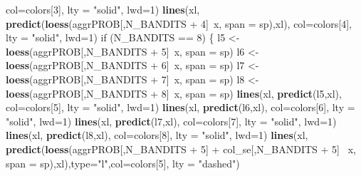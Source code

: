 \documentclass[11pt,,]{article}
\newenvironment{Shaded}{\begin{snugshade}}{\end{snugshade}}
\newcommand{\KeywordTok}[1]{\textcolor[rgb]{0.13,0.29,0.53}{\textbf{{#1}}}}
\newcommand{\DataTypeTok}[1]{\textcolor[rgb]{0.13,0.29,0.53}{{#1}}}
\newcommand{\DecValTok}[1]{\textcolor[rgb]{0.00,0.00,0.81}{{#1}}}
\newcommand{\StringTok}[1]{\textcolor[rgb]{0.31,0.60,0.02}{{#1}}}
\newcommand{\NormalTok}[1]{{#1}}
\begin{document}
\begin{Shaded}
\begin{Highlighting}[]
{          \DataTypeTok{col=}\NormalTok{colors[}\DecValTok{3}\NormalTok{], }\DataTypeTok{lty =} \StringTok{"solid"}\NormalTok{, }\DataTypeTok{lwd=}\DecValTok{1}\NormalTok{)}
    \KeywordTok{lines}\NormalTok{(xl, }\KeywordTok{predict}\NormalTok{(}\KeywordTok{loess}\NormalTok{(aggrPROB[,N_BANDITS +}\StringTok{ }\DecValTok{4}\NormalTok{]~x, }\DataTypeTok{span =} \NormalTok{sp),xl), }
          \DataTypeTok{col=}\NormalTok{colors[}\DecValTok{4}\NormalTok{], }\DataTypeTok{lty =} \StringTok{"solid"}\NormalTok{, }\DataTypeTok{lwd=}\DecValTok{1}\NormalTok{)}
    \NormalTok{if (N_BANDITS ==}\StringTok{ }\DecValTok{8}\NormalTok{) \{}
        \NormalTok{l5 <-}\StringTok{ }\KeywordTok{loess}\NormalTok{(aggrPROB[,N_BANDITS +}\StringTok{ }\DecValTok{5}\NormalTok{]~x, }\DataTypeTok{span =} \NormalTok{sp)}
        \NormalTok{l6 <-}\StringTok{ }\KeywordTok{loess}\NormalTok{(aggrPROB[,N_BANDITS +}\StringTok{ }\DecValTok{6}\NormalTok{]~x, }\DataTypeTok{span =} \NormalTok{sp)}
        \NormalTok{l7 <-}\StringTok{ }\KeywordTok{loess}\NormalTok{(aggrPROB[,N_BANDITS +}\StringTok{ }\DecValTok{7}\NormalTok{]~x, }\DataTypeTok{span =} \NormalTok{sp)}
        \NormalTok{l8 <-}\StringTok{ }\KeywordTok{loess}\NormalTok{(aggrPROB[,N_BANDITS +}\StringTok{ }\DecValTok{8}\NormalTok{]~x, }\DataTypeTok{span =} \NormalTok{sp)}
        \KeywordTok{lines}\NormalTok{(xl, }\KeywordTok{predict}\NormalTok{(l5,xl), }\DataTypeTok{col=}\NormalTok{colors[}\DecValTok{5}\NormalTok{], }\DataTypeTok{lty =} \StringTok{"solid"}\NormalTok{, }\DataTypeTok{lwd=}\DecValTok{1}\NormalTok{)}
        \KeywordTok{lines}\NormalTok{(xl, }\KeywordTok{predict}\NormalTok{(l6,xl), }\DataTypeTok{col=}\NormalTok{colors[}\DecValTok{6}\NormalTok{], }\DataTypeTok{lty =} \StringTok{"solid"}\NormalTok{, }\DataTypeTok{lwd=}\DecValTok{1}\NormalTok{)}
        \KeywordTok{lines}\NormalTok{(xl, }\KeywordTok{predict}\NormalTok{(l7,xl), }\DataTypeTok{col=}\NormalTok{colors[}\DecValTok{7}\NormalTok{], }\DataTypeTok{lty =} \StringTok{"solid"}\NormalTok{, }\DataTypeTok{lwd=}\DecValTok{1}\NormalTok{)}
        \KeywordTok{lines}\NormalTok{(xl, }\KeywordTok{predict}\NormalTok{(l8,xl), }\DataTypeTok{col=}\NormalTok{colors[}\DecValTok{8}\NormalTok{], }\DataTypeTok{lty =} \StringTok{"solid"}\NormalTok{, }\DataTypeTok{lwd=}\DecValTok{1}\NormalTok{)}
        \KeywordTok{lines}\NormalTok{(xl, }\KeywordTok{predict}\NormalTok{(}\KeywordTok{loess}\NormalTok{(aggrPROB[,N_BANDITS +}\StringTok{ }\DecValTok{5}\NormalTok{] +}\StringTok{ }\NormalTok{col_se[,N_BANDITS +}\StringTok{ }\DecValTok{5}\NormalTok{] ~x, }
                                \DataTypeTok{span =} \NormalTok{sp),xl),}\DataTypeTok{type=}\StringTok{"l"}\NormalTok{,}\DataTypeTok{col=}\NormalTok{colors[}\DecValTok{5}\NormalTok{], }\DataTypeTok{lty =} \StringTok{"dashed"}\NormalTok{)}
}
\end{Highlighting}
\end{Shaded}
\end{document}
